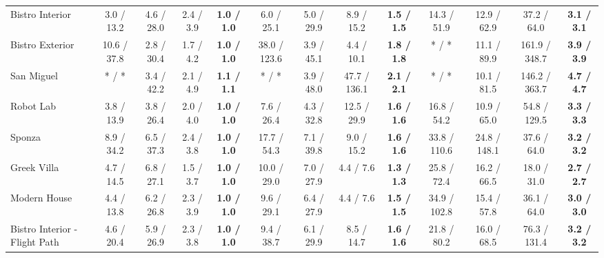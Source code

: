 \begin{table*}[t]
\begin{tabular}{l cccc|cccc|cccc}
		Bistro Interior               & 3.0 / 13.2           & 4.6 / 28.0           & 2.4 / 3.9            & \textbf{1.0 / 1.0}   & 6.0 / 25.1           & 5.0 / 29.9           & 8.9 / 15.2           & \textbf{1.5 / 1.5}   & 14.3 / 51.9          & 12.9 / 62.9          & 37.2 / 64.0          & \textbf{3.1 / 3.1}   \\
		Bistro Exterior               & 10.6 / 37.8          & 2.8 / 30.4           & 1.7 / 4.2            & \textbf{1.0 / 1.0}   & 38.0 / 123.6         & 3.9 / 45.1           & 4.4 / 10.1           & \textbf{1.8 / 1.8}   & * / *                & 11.1 / 89.9          & 161.9 / 348.7        & \textbf{3.9 / 3.9}   \\
		San Miguel                    & * / *                & 3.4 / 42.2           & 2.1 / 4.9            & \textbf{1.1 / 1.1}   & * / *                & 3.9 / 48.0           & 47.7 / 136.1         & \textbf{2.1 / 2.1}   & * / *                & 10.1 / 81.5          & 146.2 / 363.7        & \textbf{4.7 / 4.7}   \\
		Robot Lab                     & 3.8 / 13.9           & 3.8 / 26.4           & 2.0 / 4.0            & \textbf{1.0 / 1.0}   & 7.6 / 26.4           & 4.3 / 32.8           & 12.5 / 29.9          & \textbf{1.6 / 1.6}   & 16.8 / 54.2          & 10.9 / 65.0          & 54.8 / 129.5         & \textbf{3.3 / 3.3}   \\
		Sponza                        & 8.9 / 34.2           & 6.5 / 37.3           & 2.4 / 3.8            & \textbf{1.0 / 1.0}   & 17.7 / 54.3          & 7.1 / 39.8           & 9.0 / 15.2           & \textbf{1.6 / 1.6}   & 33.8 / 110.6         & 24.8 / 148.1         & 37.6 / 64.0          & \textbf{3.2 / 3.2}   \\
		Greek Villa                   & 4.7 / 14.5           & 6.8 / 27.1           & 1.5 / 3.7            & \textbf{1.0 / 1.0}   & 10.0 / 29.0          & 7.0 / 27.9           & 4.4 / 7.6            & \textbf{1.3 / 1.3}   & 25.8 / 72.4          & 16.2 / 66.5          & 18.0 / 31.0          & \textbf{2.7 / 2.7}   \\
		Modern House                  & 4.4 / 13.8           & 6.2 / 26.8           & 2.3 / 3.9            & \textbf{1.0 / 1.0}   & 9.6 / 29.1           & 6.4 / 27.9           & 4.4 / 7.6            & \textbf{1.5 / 1.5}   & 34.9 / 102.8         & 15.4 / 57.8          & 36.1 / 64.0          & \textbf{3.0 / 3.0}   \\
		Bistro Interior - Flight Path & 4.6 / 20.4           & 5.9 / 26.9           & 2.3 / 3.8            & \textbf{1.0 / 1.0}   & 9.4 / 38.7           & 6.1 / 29.9           & 8.5 / 14.7           & \textbf{1.6 / 1.6}   & 21.8 / 80.2          & 16.0 / 68.5          & 76.3 / 131.4         & \textbf{3.2 / 3.2}   \\

\end{tabular}
\end{table*}
